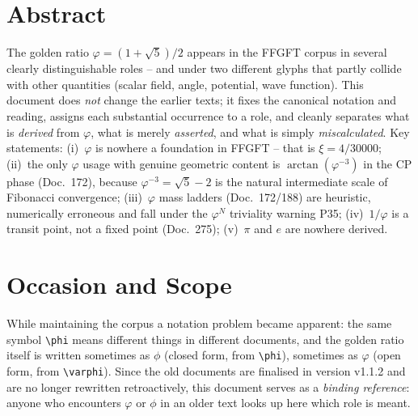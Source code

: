 
\section*{Abstract}
The golden ratio $\varphi = (1+\sqrt5)/2$ appears in the FFGFT corpus in
several clearly distinguishable roles -- and under two different glyphs that
partly collide with other quantities (scalar field, angle, potential, wave
function). This document does \emph{not} change the earlier texts; it fixes the
canonical notation and reading, assigns each substantial occurrence to a role,
and cleanly separates what is \emph{derived} from $\varphi$, what is merely
\emph{asserted}, and what is simply \emph{miscalculated}. Key statements:
(i)~$\varphi$ is nowhere a foundation in FFGFT -- that is $\xi=4/30000$;
(ii)~the only $\varphi$ usage with genuine geometric content is
$\arctan(\varphi^{-3})$ in the CP phase (Doc.~172), because
$\varphi^{-3}=\sqrt5-2$ is the natural intermediate scale of Fibonacci
convergence; (iii)~$\varphi$ mass ladders (Doc.~172/188) are heuristic,
numerically erroneous and fall under the $\varphi^N$ triviality warning P35;
(iv)~$1/\varphi$ is a transit point, not a fixed point (Doc.~275);
(v)~$\pi$ and $e$ are nowhere derived.

\section{Occasion and Scope}

While maintaining the corpus a notation problem became apparent: the same
symbol \verb|\phi| means different things in different documents, and the
golden ratio itself is written sometimes as $\phi$ (closed form, from
\verb|\phi|), sometimes as $\varphi$ (open form, from \verb|\varphi|). Since
the old documents are finalised in version v1.1.2 and are no longer rewritten
retroactively, this document serves as a \emph{binding reference}: anyone who
encounters $\varphi$ or $\phi$ in an older text looks up here which role is
meant.

